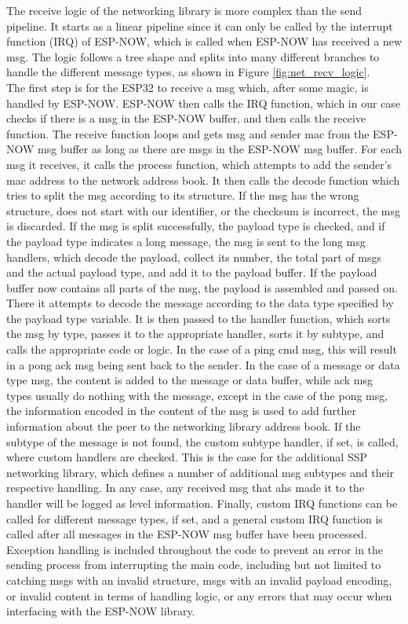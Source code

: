The receive logic of the networking library is more complex than the send pipeline. It starts as a linear pipeline since it can only be called by the interrupt function (IRQ) of ESP-NOW, which is called when ESP-NOW has received a new msg. The logic follows a tree shape and splits into many different branches to handle the different message types, as shown in Figure \ref{fig:net_recv_logic}. \\
The first step is for the ESP32 to receive a msg which, after some magic, is handled by ESP-NOW. ESP-NOW then calls the IRQ function, which in our case checks if there is a msg in the ESP-NOW buffer, and then calls the receive function. The receive function loops and gets msg and sender mac from the ESP-NOW msg buffer as long as there are msgs in the ESP-NOW msg buffer. For each msg it receives, it calls the process function, which attempts to add the sender's mac address to the network address book. It then calls the decode function which tries to split the msg according to its structure. If the msg has the wrong structure, does not start with our identifier, or the checksum is incorrect, the msg is discarded. If the msg is split successfully, the payload type is checked, and if the payload type indicates a long message, the msg is sent to the long msg handlers, which decode the payload, collect its number, the total part of msgs and the actual payload type, and add it to the payload buffer. If the payload buffer now contains all parts of the msg, the payload is assembled and passed on. There it attempts to decode the message according to the data type specified by the payload type variable. It is then passed to the handler function, which sorts the msg by type, passes it to the appropriate handler, sorts it by subtype, and calls the appropriate code or logic. In the case of a ping cmd msg, this will result in a pong ack msg being sent back to the sender. In the case of a message or data type msg, the content is added to the message or data buffer, while ack msg types usually do nothing with the message, except in the case of the pong msg, the information encoded in the content of the msg is used to add further information about the peer to the networking library address book. If the subtype of the message is not found, the custom subtype handler, if set, is called, where custom handlers are checked. This is the case for the additional SSP networking library, which defines a number of additional msg subtypes and their respective handling. In any case, any received msg that ahs made it to the handler will be logged as level information. Finally, custom IRQ functions can be called for different message types, if set, and a general custom IRQ function is called after all messages in the ESP-NOW msg buffer have been processed. \\
Exception handling is included throughout the code to prevent an error in the sending process from interrupting the main code, including but not limited to catching msgs with an invalid structure, msgs with an invalid payload encoding, or invalid content in terms of handling logic, or any errors that may occur when interfacing with the ESP-NOW library.

